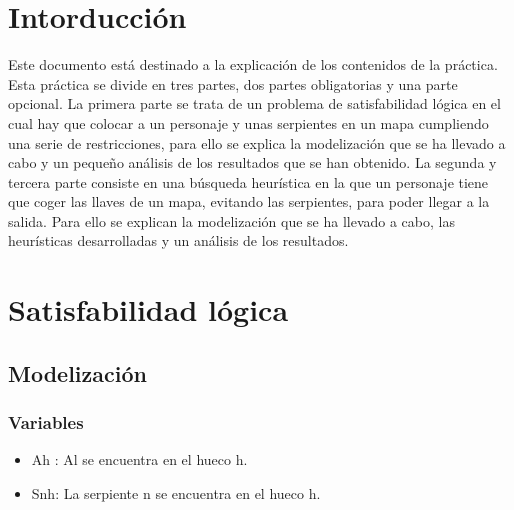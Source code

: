 \documentclass[11pt,spanish]{article}
\begin{document}


	\section{Intorducción}
	Este documento está destinado a la explicación de los contenidos de la práctica. Esta práctica se divide en tres partes, dos partes obligatorias y una parte opcional. La primera parte se trata de un problema de satisfabilidad lógica en el cual hay que colocar a un personaje y unas serpientes en un mapa cumpliendo una serie de restricciones, para ello se explica la modelización que se ha llevado a cabo y un pequeño análisis de los resultados que se han obtenido. La segunda y tercera parte consiste en una búsqueda heurística en la que un personaje tiene que coger las llaves de un mapa, evitando las serpientes, para poder llegar a la salida. Para ello se explican la modelización que se ha llevado a cabo, las heurísticas desarrolladas y un análisis de los resultados. 
	\section{Satisfabilidad lógica}
		\subsection{Modelización}
			\subsubsection{Variables}
			\begin{itemize}
				\item Ah : Al se encuentra en el hueco h.
				\item Snh: La serpiente n se encuentra en el hueco h.
			\end{itemize}
\end{document}
